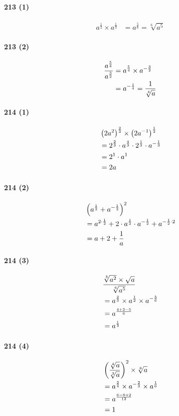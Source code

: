 \documentclass[fleqn,a4j,dvipdfmx,uplatex,twocolumn]{jsarticle}
\def\nr{\notag\\}%
\begin{document}
\paragraph{213 (1)}
\begin{align*}
  a^{\frac{1}{2}} \times a^{\frac{1}{3}} &= a^{\frac{5}{6}} = \sqrt[6]{a^5}
\end{align*}

\paragraph{213 (2)}
\begin{align*}
  \frac{a^{\frac{5}{4}}}{a^{\frac{3}{2}}} &= a^{\frac{5}{4}} \times a^{-\frac{3}{2}} \nr
  &= a^{-\frac{1}{4}} = \frac{1}{\sqrt[4]{a}}
\end{align*}

\paragraph{214 (1)}
\begin{align*}
  &\left(2a^2\right)^{\frac{2}{3}} \times \left(2a^{-1}\right)^{\frac{1}{3}} \nr
  &= 2^{\frac{2}{3}} \cdot a^{\frac{4}{3}} \cdot 2^{\frac{1}{3}} \cdot a^{-\frac{1}{3}} \nr
  &= 2^1 \cdot a^1 \nr
  &= 2a
\end{align*}

\paragraph{214 (2)}
\begin{align*}
  &\left(a^{\frac{1}{2}}+a^{-\frac{1}{2}}\right)^2 \nr
  &= a^{2 \cdot \frac{1}{2}}+2 \cdot a^{\frac{1}{2}} \cdot a^{-\frac{1}{2}}+a^{-\frac{1}{2} \cdot 2} \nr
  &= a+2+\frac{1}{a}
\end{align*}

\paragraph{214 (3)}
\begin{align*}
  &\frac{\sqrt[3]{a^2} \times \sqrt{a}}{\sqrt[6]{a^5}} \nr
  &= a^{\frac{2}{3}} \times a^{\frac{1}{2}} \times a^{-\frac{5}{6}} \nr
  &= a^{\frac{4+3-5}{6}} \nr
  &= a^{\frac{1}{3}}
\end{align*}

\paragraph{214 (4)}
\begin{align*}
  &\left(\frac{\sqrt[4]{a}}{\sqrt[3]{a}}\right)^2 \times \sqrt[6]{a} \nr
  &= a^{\frac{2}{4}} \times a^{-\frac{2}{3}} \times a^{\frac{1}{6}} \nr
  &= a^{\frac{6-8+2}{12}} \nr
  &= 1
\end{align*}
\end{document}
